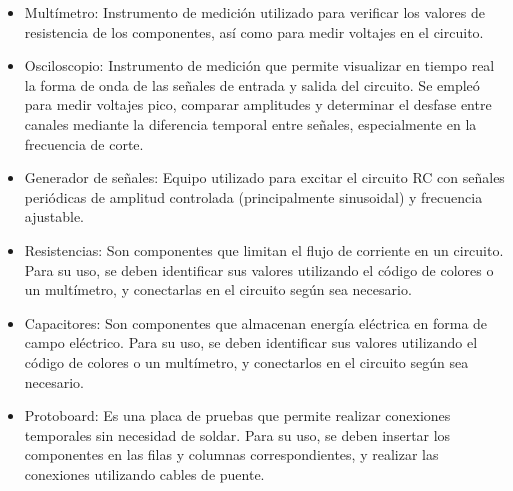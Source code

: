 \documentclass[12pt,a4paper]{article}
\begin{document}
\newpage
{}
\begin{itemize}
	\item Multímetro: Instrumento de medición utilizado para verificar los valores de resistencia de los componentes, así como para medir voltajes en el circuito. 
	\item Osciloscopio: Instrumento de medición que permite visualizar en tiempo real la forma de onda de las señales de entrada y salida del circuito. Se empleó para medir voltajes pico, comparar amplitudes y determinar el desfase entre canales mediante la diferencia temporal entre señales, especialmente en la frecuencia de corte.
	\item Generador de señales: Equipo utilizado para excitar el circuito RC con señales periódicas de amplitud controlada (principalmente sinusoidal) y frecuencia ajustable.
    \item Resistencias: Son componentes que limitan el flujo de corriente en un circuito. Para su uso, se deben identificar sus valores utilizando el código de colores o un multímetro, y conectarlas en el circuito según sea necesario.
    \item Capacitores: Son componentes que almacenan energía eléctrica en forma de campo eléctrico. Para su uso, se deben identificar sus valores utilizando el código de colores o un multímetro, y conectarlos en el circuito según sea necesario.
    \item Protoboard: Es una placa de pruebas que permite realizar conexiones temporales sin necesidad de soldar. Para su uso, se deben insertar los componentes en las filas y columnas correspondientes, y realizar las conexiones utilizando cables de puente.
\end{itemize}

\end{document}
